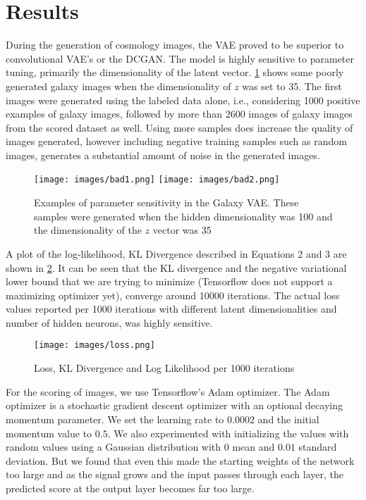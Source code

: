 \documentclass[journal]{IEEEtran}
\begin{document}
\section{Results}
During the generation of cosmology images, the VAE proved to be superior to convolutional VAE's or the DCGAN. The model is highly sensitive to parameter tuning, primarily the dimensionality of the latent vector. \ref{fig:VAEbad} shows some poorly generated galaxy images when the dimensionality of $z$ was set to 35. The first images were generated using the labeled data alone, i.e., considering 1000 positive examples of galaxy images, followed by more than 2600 images of galaxy images from the scored dataset as well. Using more samples does increase the quality of images generated, however including negative training samples such as random images, generates a substantial amount of noise in the generated images.

\begin{figure}[H]
\begin{center}
   \texttt{[image: images/bad1.png]}
   \texttt{[image: images/bad2.png]}
\end{center}
   \caption{Examples of parameter sensitivity in the Galaxy VAE. These samples were generated when the hidden dimensionality was 100 and the dimensionality of the $z$ vector was 35}
\label{fig:VAEbad}
\end{figure}

A plot of the log-likelihood, KL Divergence described in Equations 2 and 3 are shown in \ref{fig:loss}. It can be seen that the KL divergence and the negative variational lower bound that we are trying to minimize (Tensorflow does not support a maximizing optimizer yet), converge around 10000 iterations. The actual loss values reported per 1000 iterations with different latent dimensionalities and number of hidden neurons, was highly sensitive. 
\begin{figure}[H]
\begin{center}
   \texttt{[image: images/loss.png]}
\end{center}
   \caption{Loss, KL Divergence and Log Likelihood per 1000 iterations}
\label{fig:loss}
\end{figure}

For the scoring of images, we use Tensorflow's Adam optimizer. The Adam optimizer is a stochastic gradient descent optimizer with an optional decaying momentum parameter. We set the learning rate to $0.0002$ and the initial momentum value to $0.5$. We also experimented with initializing the values with random values using a Gaussian distribution with $0$ mean and $0.01$ standard deviation. But we found that even this made the starting weights of the network too large and as the signal grows and the input passes through each layer, the predicted score at the output layer becomes far too large. 
\end{document}
